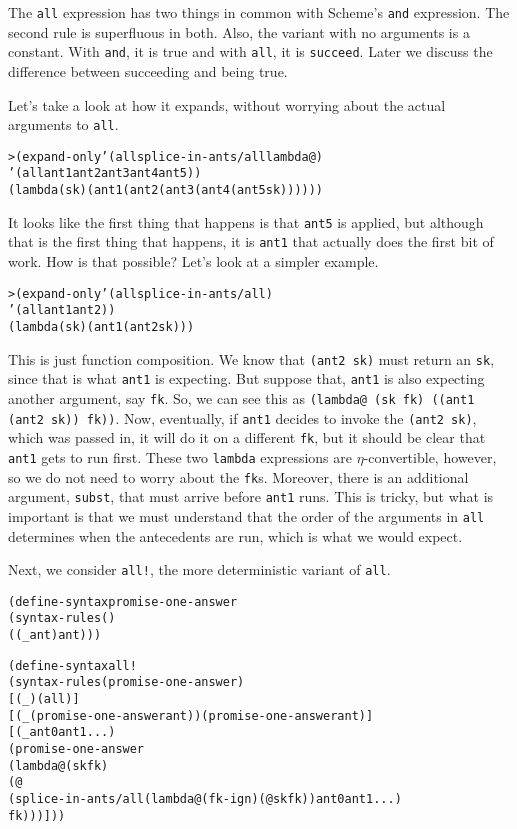 The \texttt{all} expression has two things in common with Scheme's
\texttt{and} expression.  The second rule is superfluous in both.  Also,
the variant with no arguments is a constant.  With \texttt{and}, it is true
and with \texttt{all}, it is \texttt{succeed}.  Later we discuss the
difference between succeeding and being true.

Let's take a look at how it expands, without worrying about
the actual arguments to \texttt{all}.

\begin{alltt}
> (expand-only '(all splice-in-ants/all lambda@)
    '(all ant1 ant2 ant3 ant4 ant5))
(lambda (sk) (ant1 (ant2 (ant3 (ant4 (ant5 sk))))))
\end{alltt}

\noindent
It looks like the first thing that happens is that \texttt{ant5} is
applied, but although that is the first thing that happens, it is
\texttt{ant1} that actually does the first bit of work.  How is that
possible?  Let's look at a simpler example.

\begin{alltt}
> (expand-only '(all splice-in-ants/all)
    '(all ant1 ant2))
(lambda (sk) (ant1 (ant2 sk)))
\end{alltt}

\noindent
This is just function composition.  We know that \texttt{(ant2 sk)}
must return an \texttt{sk}, since that is what \texttt{ant1} is
expecting.  But suppose that, \texttt{ant1} is also expecting another
argument, say \texttt{fk}. So, we can see this as \texttt{(lambda@ (sk
fk) ((ant1 (ant2 sk)) fk))}.  Now, eventually, if \texttt{ant1}
decides to invoke the \texttt{(ant2 sk)}, which was passed in, it will
do it on a different \texttt{fk}, but it should be clear that
\texttt{ant1} gets to run first.  These two \texttt{lambda}
expressions are $\eta$-convertible, however, so we do not need to
worry about the \texttt{fk}s.  Moreover, there is an additional
argument, \texttt{subst}, that must arrive before \texttt{ant1} runs.
This is tricky, but what is important is that we must understand that
the order of the arguments in \texttt{all} determines when the
antecedents are run, which is what we would expect.

Next, we consider \texttt{all!}, the more deterministic variant of
\texttt{all}.

\begin{alltt}
(define-syntax promise-one-answer
  (syntax-rules ()
    ((_ ant) ant)))

(define-syntax all!
  (syntax-rules (promise-one-answer)
    [(_) (all)]
    [(_ (promise-one-answer ant)) (promise-one-answer ant)]
    [(_ ant0 ant1 ...)
     (promise-one-answer
       (lambda@ (sk fk)
	 (@
	   (splice-in-ants/all (lambda@ (fk-ign) (@ sk fk)) ant0 ant1 ...)
	   fk)))]))
\end{alltt}

